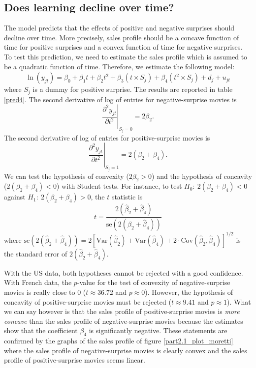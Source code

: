 \subsection{Does learning decline over time?}\label{subsec2.5}

The model predicts that the effects of positive and negative surprises should decline over time.
More precisely, sales profile should be a concave function of time for positive surprises and a convex function of time for negative surprises.
To test this prediction, we need to estimate the sales profile which is assumed to be a quadratic function of time.
Therefore, we estimate the following model:
\begin{equation*}
	\ln (y_{jt}) = \beta_0 + \beta_1 t + \beta_2 t^2 + \beta_3 (t \times S_j) + \beta_4 (t^2 \times S_j) + d_j + u_{jt}
\end{equation*}
where $S_j$ is a dummy for positive surprise.
The results are reported in table \ref{pred4}.
The second derivative of log of entries for negative-surprise movies is 
\begin{equation*}
	\left.\frac{\partial^2 y_{jt}}{\partial t^2}\right|_{S_j=0} = 2 \beta_2.
\end{equation*}
The second derivative of log of entries for positive-surprise movies is 
\begin{equation*}
	\left.\frac{\partial^2 y_{jt}}{\partial t^2}\right|_{S_j=1} = 2 (\beta_2 + \beta_4).
\end{equation*}
We can test the hypothesis of convexity ($2\beta_2 > 0$) and the hypothesis of concavity ($2(\beta_2 + \beta_4) < 0$) with Student tests.
For instance, to test $H_0:~2(\beta_2 + \beta_4) < 0$ against $H_1:~2(\beta_2 + \beta_4) > 0$, the $t$ statistic is
\begin{equation*}
	t = \frac{2(\hat{\beta}_2 + \hat{\beta}_4)}{\text{se}(2(\hat{\beta}_2 + \hat{\beta}_4))} 
\end{equation*}
where $\text{se}(2(\hat{\beta}_2 + \hat{\beta}_4)) = 2[\text{Var}(\hat{\beta}_2) + \text{Var}(\hat{\beta}_4) + 2\cdot \text{Cov}(\hat{\beta}_2, \hat{\beta}_4)]^{1/2}$ is the standard error of $2(\hat{\beta}_2 + \hat{\beta}_4)$.

With the US data, both hypotheses cannot be rejected with a good confidence.
With French data, the $p$-value for the test of convexity of negative-surprise movies is really close to 0 ($t \approx 36.72$ and $p \approx 0$). 
However, the hypothesis of concavity of positive-surprise movies must be rejected ($t \approx 9.41$ and $p \approx 1$).
What we can say however is that the sales profile of positive-surprise movies is \textit{more concave} than the sales profile of negative-surprise movies because the estimates show that the coefficient $\beta_4$ is significantly negative.
These statements are confirmed by the graphs of the sales profile of figure \ref{part2.1_plot_moretti} where the sales profile of negative-surprise movies is clearly convex and the sales profile of positive-surprise movies seems linear.

